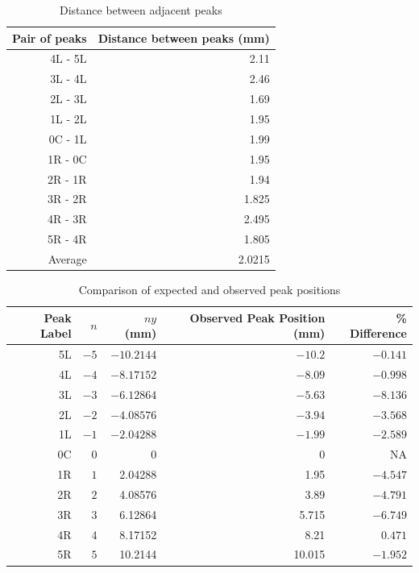 \begin{table}[ht!]
	\centering
	\begin{tabular}{|r|r|} \hline
		Pair of peaks & Distance between peaks (mm) \\
		\hline
		4L - 5L & 2.11 \\
		3L - 4L & 2.46 \\
		2L - 3L & 1.69 \\
		1L - 2L & 1.95 \\
		0C - 1L & 1.99 \\
		1R - 0C & 1.95 \\
		2R - 1R & 1.94 \\
		3R - 2R & 1.825 \\
		4R - 3R & 2.495 \\
		5R - 4R & 1.805 \\
		\hline
		Average & 2.0215 \\
		\hline
	\end{tabular}
	\caption{Distance between adjacent peaks}
	\label{table.disA}
\end{table}
\begin{table}[ht!]
	\centering
	\begin{tabular}{|r|r|r|r|r|} \hline
		Peak Label & $n$ & $n y$ (mm) & Observed Peak Position (mm) & \% Difference \\
		\hline
		5L & $-5$ & $-10.2144$ & $-10.2$ & $-0.141$ \\
		4L & $-4$ & $-8.17152$ & $-8.09$ & $-0.998$ \\
		3L & $-3$ & $-6.12864$ & $-5.63$ & $-8.136$ \\
		2L & $-2$ & $-4.08576$ & $-3.94$ & $-3.568$ \\
		1L & $-1$ & $-2.04288$ & $-1.99$ & $-2.589$ \\
		0C & $0$ & 0 & 0 & NA \\
		1R & $1$ & 2.04288 & 1.95 & $-4.547$ \\
		2R & $2$ & 4.08576 & 3.89 & $-4.791$ \\
		3R & $3$ & 6.12864 & 5.715 & $-6.749$ \\
		4R & $4$ & 8.17152 & 8.21 & $0.471$ \\
		5R & $5$ & 10.2144 & 10.015 & $-1.952$ \\
		\hline
	\end{tabular}
	\caption{Comparison of expected and observed peak positions}
	\label{compa}
\end{table}

